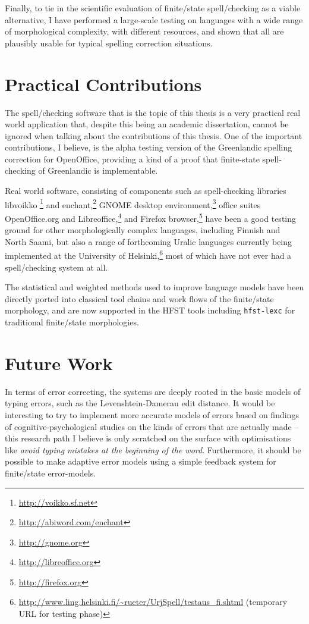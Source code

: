 \documentclass[officiallayout,final]{unihelcompling}
\begin{document}
Finally, to tie in the scientific evaluation of finite\-/state spell\-/checking
as a viable alternative, I have performed a large-scale testing on languages
with a wide range of morphological complexity, with different resources, and
shown that all are plausibly usable for typical spelling correction situations.


\section{Practical Contributions}
\label{sec:practical-contributions}

The spell\-/checking software that is the topic of this thesis is a very
practical real world application that, despite this being an academic
dissertation, cannot be ignored when talking about the contributions of this
thesis. One of the important contributions, I believe, is the alpha testing
version of the Greenlandic spelling correction for OpenOffice, providing a kind
of a proof that finite-state spell-checking of Greenlandic is implementable.

Real world software, consisting of components such as spell-checking libraries
libvoikko \footnote{\url{http://voikko.sf.net}} and
enchant,\footnote{\url{http://abiword.com/enchant}} GNOME desktop
environment,\footnote{\url{http://gnome.org}} office suites OpenOffice.org and
Libreoffice,\footnote{\url{http://libreoffice.org}} and Firefox
browser,\footnote{\url{http://firefox.org}} have been a good testing ground for
other morphologically complex languages, including Finnish and North Saami, but
also a range of forthcoming Uralic languages currently being implemented at
the University of
Helsinki,\footnote{\url{http://www.ling.helsinki.fi/~rueter/UrjSpell/testaus_fi.shtml}
(temporary URL for testing phase)} most of which have not ever had a
spell\-/checking system at all. 

The statistical and weighted methods used to improve language models have
been directly ported into classical tool chains and work flows of the 
finite\-/state morphology, and are now supported in the HFST tools including
\texttt{hfst-lexc} for traditional finite\-/state morphologies.

\section{Future Work}
\label{sec:future-work}

In terms of error correcting, the systems are deeply rooted in the basic models
of typing errors, such as the Levenshtein-Damerau edit distance. It would be
interesting to try to implement more accurate models of errors based on
findings of cognitive-psychological studies on the kinds of errors that are
actually made -- this research path I believe is only scratched on the surface
with optimisations like \emph{avoid typing mistakes at the beginning of the
word}. Furthermore, it should be possible to make adaptive error models using a
simple feedback system for finite\-/state error-models.
\end{document}
